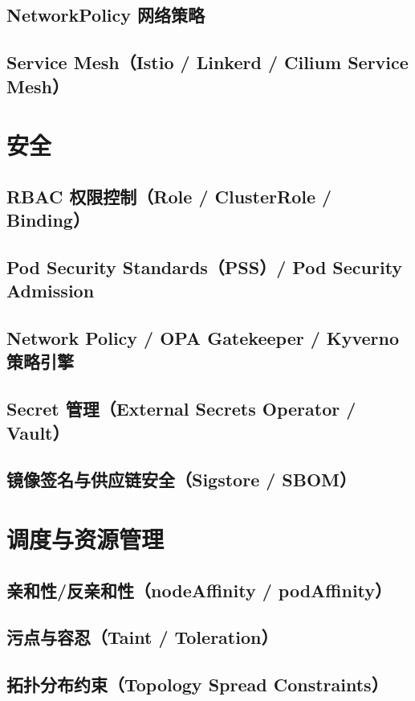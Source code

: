 \documentclass[12pt,UTF8]{ctexbook}
\begin{document}
    \subsection{NetworkPolicy 网络策略}
    \subsection{Service Mesh（Istio / Linkerd / Cilium Service Mesh）}

  \section{安全}
    \subsection{RBAC 权限控制（Role / ClusterRole / Binding）}
    \subsection{Pod Security Standards（PSS）/ Pod Security Admission}
    \subsection{Network Policy / OPA Gatekeeper / Kyverno 策略引擎}
    \subsection{Secret 管理（External Secrets Operator / Vault）}
    \subsection{镜像签名与供应链安全（Sigstore / SBOM）}

  \section{调度与资源管理}
    \subsection{亲和性/反亲和性（nodeAffinity / podAffinity）}
    \subsection{污点与容忍（Taint / Toleration）}
    \subsection{拓扑分布约束（Topology Spread Constraints）}
\end{document}
